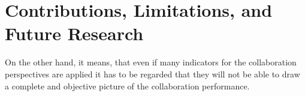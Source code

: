 \section{Contributions, Limitations, and Future Research} %
\label{sec:contributions_limitations_and_future_research}


On the other hand, it means, that even if many indicators for the collaboration perspectives are applied it has to be regarded that they will not be able to draw a complete and objective picture of the collaboration performance.

